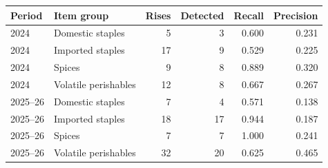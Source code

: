 \begin{tabular}{llrrrr}
\toprule
\textbf{Period} & \textbf{Item group} & \textbf{Rises} & \textbf{Detected} & \textbf{Recall} & \textbf{Precision} \\
\midrule
2024 & Domestic staples & 5 & 3 & 0.600 & 0.231 \\
2024 & Imported staples & 17 & 9 & 0.529 & 0.225 \\
2024 & Spices & 9 & 8 & 0.889 & 0.320 \\
2024 & Volatile perishables & 12 & 8 & 0.667 & 0.267 \\
2025--26 & Domestic staples & 7 & 4 & 0.571 & 0.138 \\
2025--26 & Imported staples & 18 & 17 & 0.944 & 0.187 \\
2025--26 & Spices & 7 & 7 & 1.000 & 0.241 \\
2025--26 & Volatile perishables & 32 & 20 & 0.625 & 0.465 \\
\bottomrule
\end{tabular}
